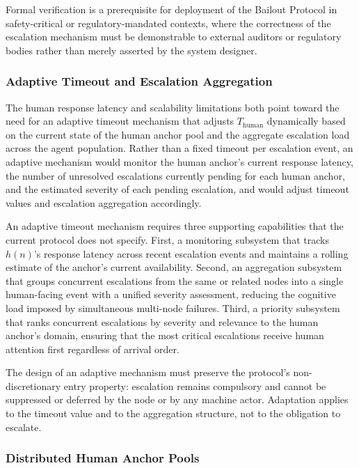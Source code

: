 Formal verification is a prerequisite for deployment of the Bailout Protocol in safety-critical or regulatory-mandated contexts, where the correctness of the escalation mechanism must be demonstrable to external auditors or regulatory bodies rather than merely asserted by the system designer.

\subsubsection{Adaptive Timeout and Escalation Aggregation}

The human response latency and scalability limitations both point toward the need for an adaptive timeout mechanism that adjusts $T_{\text{human}}$ dynamically based on the current state of the human anchor pool and the aggregate escalation load across the agent population. Rather than a fixed timeout per escalation event, an adaptive mechanism would monitor the human anchor's current response latency, the number of unresolved escalations currently pending for each human anchor, and the estimated severity of each pending escalation, and would adjust timeout values and escalation aggregation accordingly.

An adaptive timeout mechanism requires three supporting capabilities that the current protocol does not specify. First, a monitoring subsystem that tracks $h(n)$'s response latency across recent escalation events and maintains a rolling estimate of the anchor's current availability. Second, an aggregation subsystem that groups concurrent escalations from the same or related nodes into a single human-facing event with a unified severity assessment, reducing the cognitive load imposed by simultaneous multi-node failures. Third, a priority subsystem that ranks concurrent escalations by severity and relevance to the human anchor's domain, ensuring that the most critical escalations receive human attention first regardless of arrival order.

The design of an adaptive mechanism must preserve the protocol's non-discretionary entry property: escalation remains compulsory and cannot be suppressed or deferred by the node or by any machine actor. Adaptation applies to the timeout value and to the aggregation structure, not to the obligation to escalate.

\subsubsection{Distributed Human Anchor Pools}

